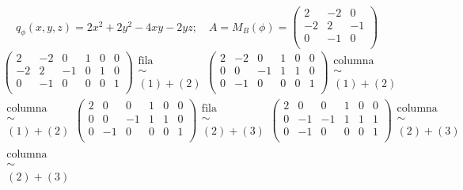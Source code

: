 \begin{example}
	\[
	q_\phi(x,y,z)=2x^2+2y^2-4xy-2yz; \quad A = M_B(\phi) =
	\begin{pmatrix}
	2 & -2 & 0 \\
	-2 & 2 & -1 \\
	0 & -1 & 0 \\
	\end{pmatrix}
	\]
	\begin{gather*}
		\left(
		\begin{array}{ccc|ccc}
			2 & -2 & 0 & 1 & 0 & 0 \\
			-2 & 2 & -1 & 0 & 1 & 0 \\
			0 & -1 & 0 & 0 & 0 & 1 \\
		\end{array}
		\right)
		\substack{\text{fila} \\ \sim \\ (1) + (2)}
		\left(
		\begin{array}{ccc|ccc}
			2 & -2 & 0 & 1 & 0 & 0 \\
			0 & 0 & -1 & 1 & 1 & 0 \\
			0 & -1 & 0 & 0 & 0 & 1 \\
		\end{array}
		\right)
		\substack{\text{columna} \\ \sim \\ (1) + (2)}
		\\
		\substack{\text{columna} \\ \sim \\ (1) + (2)}
		\left(
		\begin{array}{ccc|ccc}
			2 & 0 & 0 & 1 & 0 & 0 \\
			0 & 0 & -1 & 1 & 1 & 0 \\
			0 & -1 & 0 & 0 & 0 & 1 \\
		\end{array}
		\right)
		\substack{\text{fila} \\ \sim \\ (2) + (3)}
		\left(
		\begin{array}{ccc|ccc}
			2 & 0 & 0 & 1 & 0 & 0 \\
			0 & -1 & -1 & 1 & 1 & 1 \\
			0 & -1 & 0 & 0 & 0 & 1 \\
		\end{array}
		\right)
		\substack{\text{columna} \\ \sim \\ (2) + (3)}
		\\
		\substack{\text{columna} \\ \sim \\ (2) + (3)}

\end{gather*}
\end{example}
